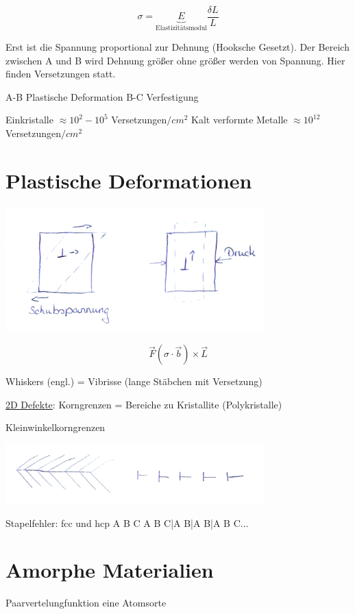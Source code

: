 \[ \sigma = \underbrace{E}_{\text{Elastizitätsmodul}} \frac {\delta L} L \]

Erst ist die Spannung proportional zur Dehnung (Hooksche Gesetzt). Der
Bereich zwischen A und B wird Dehnung größer ohne größer werden von
Spannung. Hier finden Versetzungen statt. 

A-B Plastische Deformation
B-C Verfestigung

Einkristalle \(\approx 10^2-10^5\) Versetzungen\(/cm^2\)
Kalt verformte Metalle \(\approx 10^{12}\) Versetzungen\(/cm^2\)


\section{Plastische Deformationen}


\includegraphics[width=0.75\textwidth]{kap04_06.png}

\[ \vec F (\sigma\cdot \vec b) \times \vec L \]

Whiskers (engl.) =  Vibrisse (lange Stäbchen mit Versetzung)

\underline{2D Defekte}: Korngrenzen = Bereiche zu Kristallite (Polykristalle)

Kleinwinkelkorngrenzen 

\includegraphics[width=0.75\textwidth]{kap04_07.png}

Stapelfehler: fcc und hcp   A B C A B C|A B|A B|A B C...

\section{Amorphe Materialien}

Paarvertelungfunktion eine Atomsorte

